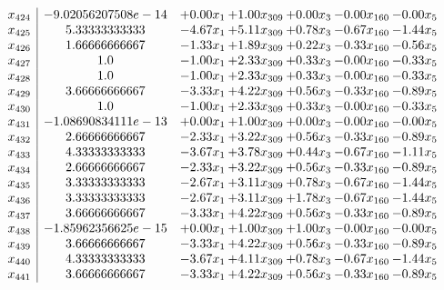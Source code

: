 \documentclass[8pt]{article}
\begin{document}
\[\begin{array}{c| c c@{\hskip 2pt} c@{\hskip 2pt} c@{\hskip 2pt} c@{\hskip 2pt} c@{\hskip 2pt} }
 x_{424}   &  -9.02056207508e-14 & +  0.00 x_{1} & +  1.00 x_{309} & +  0.00 x_{3} & -0.00 x_{160} & -0.00 x_{5}\\
 x_{425}   &  5.33333333333 & -4.67 x_{1} & +  5.11 x_{309} & +  0.78 x_{3} & -0.67 x_{160} & -1.44 x_{5}\\
 x_{426}   &  1.66666666667 & -1.33 x_{1} & +  1.89 x_{309} & +  0.22 x_{3} & -0.33 x_{160} & -0.56 x_{5}\\
 x_{427}   &  1.0 & -1.00 x_{1} & +  2.33 x_{309} & +  0.33 x_{3} & -0.00 x_{160} & -0.33 x_{5}\\
 x_{428}   &  1.0 & -1.00 x_{1} & +  2.33 x_{309} & +  0.33 x_{3} & -0.00 x_{160} & -0.33 x_{5}\\
 x_{429}   &  3.66666666667 & -3.33 x_{1} & +  4.22 x_{309} & +  0.56 x_{3} & -0.33 x_{160} & -0.89 x_{5}\\
 x_{430}   &  1.0 & -1.00 x_{1} & +  2.33 x_{309} & +  0.33 x_{3} & -0.00 x_{160} & -0.33 x_{5}\\
 x_{431}   &  -1.08690834111e-13 & +  0.00 x_{1} & +  1.00 x_{309} & +  0.00 x_{3} & -0.00 x_{160} & -0.00 x_{5}\\
 x_{432}   &  2.66666666667 & -2.33 x_{1} & +  3.22 x_{309} & +  0.56 x_{3} & -0.33 x_{160} & -0.89 x_{5}\\
 x_{433}   &  4.33333333333 & -3.67 x_{1} & +  3.78 x_{309} & +  0.44 x_{3} & -0.67 x_{160} & -1.11 x_{5}\\
 x_{434}   &  2.66666666667 & -2.33 x_{1} & +  3.22 x_{309} & +  0.56 x_{3} & -0.33 x_{160} & -0.89 x_{5}\\
 x_{435}   &  3.33333333333 & -2.67 x_{1} & +  3.11 x_{309} & +  0.78 x_{3} & -0.67 x_{160} & -1.44 x_{5}\\
 x_{436}   &  3.33333333333 & -2.67 x_{1} & +  3.11 x_{309} & +  1.78 x_{3} & -0.67 x_{160} & -1.44 x_{5}\\
 x_{437}   &  3.66666666667 & -3.33 x_{1} & +  4.22 x_{309} & +  0.56 x_{3} & -0.33 x_{160} & -0.89 x_{5}\\
 x_{438}   &  -1.85962356625e-15 & +  0.00 x_{1} & +  1.00 x_{309} & +  1.00 x_{3} & -0.00 x_{160} & -0.00 x_{5}\\
 x_{439}   &  3.66666666667 & -3.33 x_{1} & +  4.22 x_{309} & +  0.56 x_{3} & -0.33 x_{160} & -0.89 x_{5}\\
 x_{440}   &  4.33333333333 & -3.67 x_{1} & +  4.11 x_{309} & +  0.78 x_{3} & -0.67 x_{160} & -1.44 x_{5}\\
 x_{441}   &  3.66666666667 & -3.33 x_{1} & +  4.22 x_{309} & +  0.56 x_{3} & -0.33 x_{160} & -0.89 x_{5}\\

\end{array}\]
\end{document}
